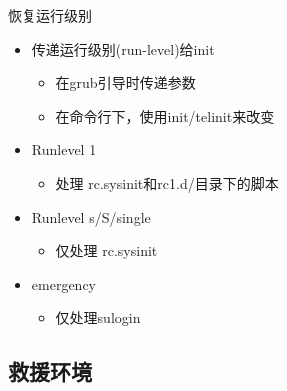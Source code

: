 \begin{frame}{恢复运行级别}
\begin{itemize}
\item 传递运行级别(run-level)给init

\begin{itemize}
\item 在grub引导时传递参数
\item 在命令行下，使用init/telinit来改变
\end{itemize}
\item Runlevel 1

\begin{itemize}
\item 处理 rc.sysinit和rc1.d/目录下的脚本
\end{itemize}
\item Runlevel s/S/single

\begin{itemize}
\item 仅处理 rc.sysinit
\end{itemize}
\item emergency

\begin{itemize}
\item 仅处理sulogin
\end{itemize}
\end{itemize}
\end{frame} 

\subsection{救援环境}

